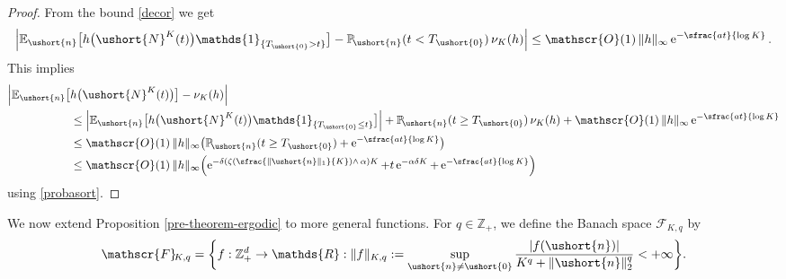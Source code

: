 \documentclass[JEP,XML,SOM,Unicode]{cedram}
\newcommand{\Psfrac}[2]{(\sfrac{#1}{#2})}
\newcommand{\scaleto}[2]{#1}
\let\mathcal\mathscr
\numberwithin{equation}{section}
\theoremstyle{plain}
\theoremstyle{definition}
\newcommand{\proba}{{\mathbb{P}}}
\newcommand{\E}{{\mathbb{E}}}
\newcommand{\zentiers}{{\mathbb{Z}}}
\newcommand{\domaine}{\zentiers_{+}^{d}}
\newcommand{\Oun}{\mathcal{O}(1)}
\newcommand{\sK}{K}
\newcommand{\un}{\mathds{1}}
\newcommand{\vecn}{\ushort{n}}
\newcommand{\veczer}{\ushort{0}}
\newcommand{\leproc}{\ushort{N}^{K}}
\newcommand{\nuk}{\nu_{K}}\let\snuk\nuk
\newcommand{\e}{\operatorname{e}}
\newcommand{\normdeux}[1]{\|#1\|_{2}}\let\snormdeux\normdeux
\begin{document}
\begin{proof}
From the bound \eqref{decor} we get
\[
\left|\E_{\vecn}\bigl[h\bigl(\leproc(t)\bigr)\un_{\{T_{\veczer}>t\}}\bigr]
-\proba\!_{\vecn}(t<T_{\veczer})\,\nuk(h)\right|
\le\Oun\, \|h\|_{\scaleto{\infty}{3pt}}\e^{-\sfrac{a t}{\log K}}.
\]
This implies
\begin{align*}
\Bigl|\E_{\vecn}\bigl[&h\bigl(\leproc(t)\bigr)\bigr]-\nuk(h)\Bigr| \\
& \le
\left|\E_{\vecn} \bigl[h\bigl(\leproc(t)\bigr)\un_{\{T_{\veczer}\le t\}} \bigr]\right|
+\proba\!_{\vecn}(t\ge T_{\veczer})\,\nuk(h)+\Oun\, \|h\|_{\scaleto{\infty}{3pt}}\e^{-\sfrac{a t}{\log K}}
\\
& \le \Oun\, \|h\|_{\scaleto{\infty}{3pt}}\bigl(\proba\!_{\vecn}(t\ge T_{\veczer})+\e^{-\sfrac{a t}{\log K}}\bigr)
\\
& \le \Oun\, \|h\|_{\scaleto{\infty}{3pt}}\Bigl(\e^{-\delta\left(\zeta\Psfrac{\|\vecn\|_{1}}{K}\wedge\,\alpha\right)K}
+t \e^{-\alpha\delta K}+\e^{-\sfrac{a t}{\log K}}\Bigr)
\end{align*}
using \eqref{probasort}.
\end{proof}

We now extend Proposition \ref{pre-theorem-ergodic} to more general functions.
For $q\in\zentiers_+$, we define the Banach space
$\mathscr{F}\!_{\sK,q}$ by
\begin{equation}\label{observables}
\mathscr{F}\!_{\sK,q}
=\biggl\{f: \domaine \rightarrow \mathds{R} :
\|f\|_{\sK,q}:= \sup_{ \vecn\neq \veczer} \frac{|f(\vecn)|}{K^q+\normdeux{\vecn}^{\scaleto{q}{3.6pt}}}<+\infty \biggr\}.
\end{equation}
\end{document}
